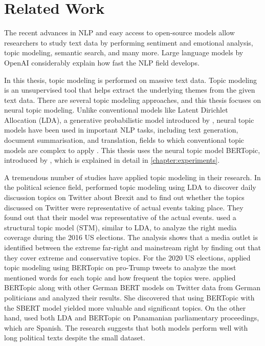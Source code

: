 
\chapter{Related Work}\label{chapter:related_work}

The recent advances in \ac{NLP} and easy access to open-source models allow researchers to 
study text data by performing sentiment and emotional analysis, topic modeling, 
semantic search, and many more. Large language models by OpenAI considerably 
explain how fast the NLP field develops.

In this thesis, topic modeling is performed on massive text data. Topic modeling is an 
unsupervised tool that helps extract the underlying themes from the given text data. 
There are several topic modeling approaches, and this thesis focuses on neural topic modeling. 
Unlike conventional models like Latent Dirichlet Allocation (LDA), a generative probabilistic 
model introduced by \textcite{blei_lda_2003}, neural topic models have been used in important NLP 
tasks, including text generation, document summarisation, and translation, fields to 
which conventional topic models are complex to apply \parencite{zhao_neural_topic_models_2021}.
This thesis uses the neural topic model BERTopic, introduced by \textcite{bertopic}, 
which is explained in detail in \autoref{chapter:experiments}.

A tremendous number of studies have applied topic modeling in their research. 
In the political science field, \textcite{ilyas_brexit_topic_modeling_2020} performed topic modeling 
using LDA to discover daily discussion topics on Twitter about Brexit and to find out whether 
the topics discussed on Twitter were representative of actual events taking place. 
They found out that their model was representative of the actual events.
\textcite{kaiser_right_media_USA_stm_topic_modeling_2020} used a structural topic model (STM), 
similar to LDA, to analyze the right media coverage during the 2016 US elections. 
The analysis shows that a media outlet is identified between the extreme far-right and 
mainstream right by finding out that they cover extreme and conservative topics.
For the 2020 US elections, \textcite{anwar_analyzing_twitter_BERT_QAnon_2021} applied 
topic modeling using BERTopic on pro-Trump tweets to analyze the most mentioned words for 
each topic and how frequent the topics were.
\textcite{bertopic_twitter_german_politics_2022} applied BERTopic along with other 
German BERT models on Twitter data from German politicians and analyzed their results. 
She discovered that using BERTopic with the SBERT model yielded more valuable and significant topics.
On the other hand, \textcite{contreras_panama_lda_bertopic_2022} used both LDA and BERTopic 
on Panamanian parliamentary proceedings, which are Spanish. The research suggests that both 
models perform well with long political texts despite the small dataset. 

